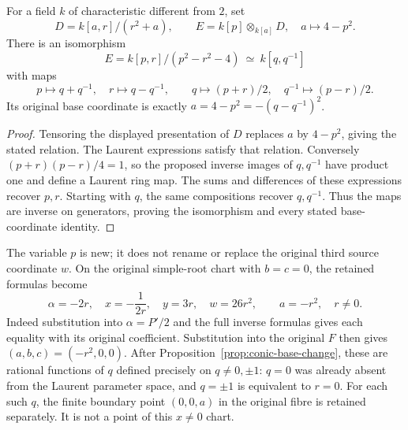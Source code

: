 \begin{proposition}
\label{prop:conic-base-change}
For a field $k$ of characteristic different from $2$, set
\[
 D=k[a,r]/(r^2+a),\qquad
 E=k[p]\otimes_{k[a]}D,\quad a\longmapsto4-p^2.
\]
There is an isomorphism
\[
 E=k[p,r]/(p^2-r^2-4)\ \simeq\ k[q,q^{-1}]
\]
with maps
\[
 p\longmapsto q+q^{-1},\quad r\longmapsto q-q^{-1},
 \qquad q\longmapsto(p+r)/2,\quad q^{-1}\longmapsto(p-r)/2.
\]
Its original base coordinate is exactly
$a=4-p^2=-(q-q^{-1})^2$.
\end{proposition}
\begin{proof}
Tensoring the displayed presentation of $D$ replaces $a$ by $4-p^2$,
giving the stated relation. The Laurent expressions satisfy that
relation. Conversely $(p+r)(p-r)/4=1$, so the proposed inverse images
of $q,q^{-1}$ have product one and define a Laurent ring map.
The sums and differences of these expressions recover $p,r$.
Starting with $q$, the same compositions recover $q,q^{-1}$.
Thus the maps are inverse on generators, proving the isomorphism
and every stated base-coordinate identity.
\end{proof}

The variable $p$ is new; it does not rename or replace the original
third source coordinate $w$. On the original simple-root chart with
$b=c=0$, the retained formulas become
\[
 \alpha=-2r,\quad x=-\frac1{2r},\quad y=3r,\quad w=26r^2,
 \qquad a=-r^2,\quad r\ne0.
\]
Indeed substitution into $\alpha=P'/2$ and the full inverse formulas
gives each equality with its original coefficient.
Substitution into the original $F$ then gives $(a,b,c)=(-r^2,0,0)$.
After Proposition~\ref{prop:conic-base-change}, these are rational
functions of $q$ defined precisely on $q\ne0,\pm1$:
$q=0$ was already absent from the Laurent parameter space, and
$q=\pm1$ is equivalent to $r=0$.
For each such $q$, the finite boundary point $(0,0,a)$ in the original
fibre is retained separately. It is not a point of this $x\ne0$ chart.

